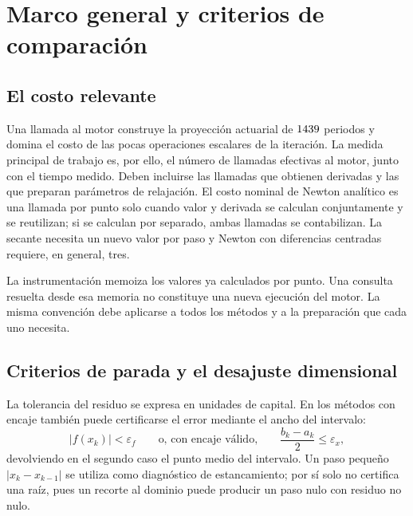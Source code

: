 \section{Marco general y criterios de comparación}

\subsection{El costo relevante}

\begin{remark}
\label{rem:costo}
Una llamada al motor construye la proyección actuarial de $1439$
periodos y domina el costo de las pocas operaciones escalares de la iteración.
La medida principal de trabajo es, por ello, el número de llamadas efectivas
al motor, junto con el tiempo medido. Deben incluirse las llamadas que
obtienen derivadas y las que preparan parámetros de relajación. El costo
nominal de Newton analítico es una llamada por punto solo cuando valor y
derivada se calculan conjuntamente y se reutilizan; si se calculan por
separado, ambas llamadas se contabilizan. La secante necesita un nuevo valor
por paso y Newton con diferencias centradas requiere, en general, tres.
\end{remark}

La instrumentación memoiza los valores ya calculados por punto. Una consulta
resuelta desde esa memoria no constituye una nueva ejecución del motor. La
misma convención debe aplicarse a todos los métodos y a la preparación que
cada uno necesita.

\subsection{Criterios de parada y el desajuste dimensional}
\label{sec:parada}

La tolerancia del residuo se expresa en unidades de capital. En los métodos
con encaje también puede certificarse el error mediante el ancho del intervalo:
\begin{equation}
\label{eq:parada}
  |f(x_k)|<\varepsilon_f
  \qquad\text{o, con encaje válido,}\qquad
  \frac{b_k-a_k}{2}\le\varepsilon_x ,
\end{equation}
devolviendo en el segundo caso el punto medio del intervalo. Un paso pequeño
$|x_k-x_{k-1}|$ se utiliza como diagnóstico de estancamiento; por sí solo no
certifica una raíz, pues un recorte al dominio puede producir un paso nulo
con residuo no nulo.

